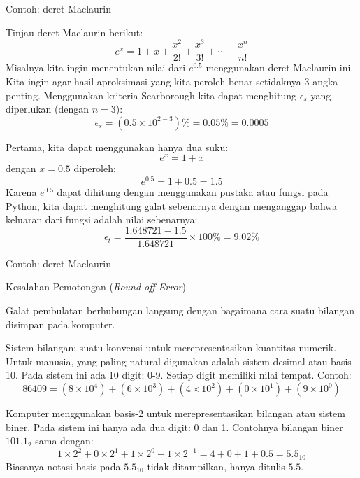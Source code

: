 \begin{frame}[fragile]{Contoh: deret Maclaurin}
\fontsize{9}{10}\selectfont

Tinjau deret Maclaurin berikut:
\begin{equation*}
e^{x} = 1 + x + \frac{x^2}{2!} + \frac{x^3}{3!} + \cdots + \frac{x^{n}}{n!}
\end{equation*}
Misalnya kita ingin menentukan nilai dari $e^{0.5}$ menggunakan deret Maclaurin ini.
Kita ingin agar hasil aproksimasi yang kita peroleh benar setidaknya 3 angka penting.
Menggunakan kriteria Scarborough kita dapat menghitung $\epsilon_s$ yang
diperlukan (dengan $n=3$):
\begin{equation*}
\epsilon_{s} = (0.5 \times 10^{2-3})\% = 0.05\% = 0.0005
\end{equation*}

Pertama, kita dapat menggunakan hanya dua suku:
$$
e^{x} = 1 + x
$$
dengan $x = 0.5$ diperoleh:
$$
e^{0.5} = 1 + 0.5 = 1.5
$$
Karena $e^{0.5}$ dapat dihitung dengan menggunakan pustaka atau fungsi 
pada Python, kita dapat menghitung galat sebenarnya dengan menganggap bahwa keluaran
dari fungsi  adalah nilai sebenarnya:
$$
\epsilon_{t} = \frac{1.648721 - 1.5}{1.648721} \times 100\% = 9.02\%
$$
\end{frame}


\begin{frame}[fragile]{Contoh: deret Maclaurin}
\fontsize{9}{10}\selectfont

\end{frame}



\begin{frame}{Kesalahan Pemotongan (\textit{Round-off Error})}

Galat pembulatan berhubungan langsung dengan bagaimana cara suatu bilangan
disimpan pada komputer.

Sistem bilangan: suatu konvensi untuk merepresentasikan
kuantitas numerik.
Untuk manusia, yang paling natural digunakan adalah sistem desimal atau
basis-10. Pada sistem ini ada 10 digit: 0-9. Setiap digit memiliki nilai tempat.
Contoh:
$$
86409 = (8 \times 10^4) + (6 \times 10^3) + (4 \times 10^2) + (0 \times 10^1) +
(9\times 10^0)
$$

Komputer menggunakan basis-2 untuk merepresentasikan bilangan atau sistem biner.
Pada sistem ini hanya ada dua digit: 0 dan 1.
Contohnya bilangan biner $101.1_{2}$ sama dengan:
\begin{equation*}
1 \times 2^2 + 0 \times 2^1 + 1 \times 2^0 + 1 \times 2^{-1} = 4 + 0 + 1 + 0.5 = 5.5_{10}
\end{equation*}
Biasanya notasi basis pada $5.5_{10}$ tidak ditampilkan, hanya ditulis $5.5$.

\end{frame}



